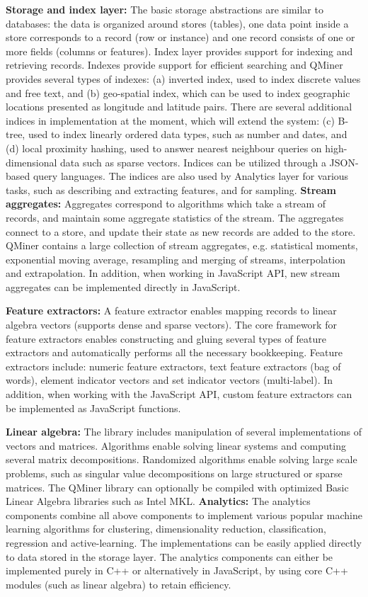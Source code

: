 \documentclass{article} %
\begin{document}
\textbf{Storage and index layer:} The basic storage abstractions are similar to databases: the data is organized around stores (tables), one data point inside a store corresponds to a record (row or instance) and one record consists of one or more fields (columns or features). Index layer provides support for indexing and retrieving records. Indexes provide support for efficient searching and QMiner provides several types of indexes: (a) inverted index, used to index discrete values and free text, and (b) geo-spatial index, which can be used to index geographic locations presented as longitude and latitude pairs. There are several additional indices in implementation at the moment, which will extend the system: (c) B-tree, used to index linearly ordered data types, such as number and dates, and (d) local proximity hashing, used to answer nearest neighbour queries on high-dimensional data such as sparse vectors. Indices can be utilized through a JSON-based query languages. The indices are also used by Analytics layer for various tasks, such as describing and extracting features, and for sampling.
\textbf{Stream aggregates:} Aggregates correspond to algorithms which take a stream of records, and maintain some aggregate statistics of the stream. The aggregates connect to a store, and update their state as new records are added to the store. QMiner contains a large collection of stream aggregates, e.g. statistical moments, exponential moving average, resampling and merging of streams, interpolation and extrapolation. In addition, when working in JavaScript API, new stream aggregates can be implemented directly in JavaScript.

\textbf{Feature extractors:} A feature extractor enables mapping records to linear algebra vectors (supports dense and sparse vectors). The core framework for feature extractors enables constructing and gluing several types of feature extractors and automatically performs all the necessary bookkeeping. Feature extractors include: numeric feature extractors, text feature extractors (bag of words), element indicator vectors and set indicator vectors (multi-label). In addition, when working with the JavaScript API, custom feature extractors can be implemented as JavaScript functions.

\textbf{Linear algebra:} The library includes manipulation of several implementations of vectors and matrices. Algorithms enable solving linear systems and computing several matrix decompositions. Randomized algorithms enable solving large scale problems, such as singular value decompositions on large structured or sparse matrices. The QMiner library can optionally
be compiled with optimized Basic Linear Algebra libraries such as Intel MKL.
\textbf{Analytics:} The analytics components combine all above components to implement various popular machine learning algorithms for clustering, dimensionality reduction, classification, regression and active-learning. The implementations can be easily applied directly to data stored in the storage layer. The analytics components can either be implemented purely in C++ or alternatively in JavaScript, by using core C++ modules (such as linear algebra) to retain efficiency.
\end{document}
